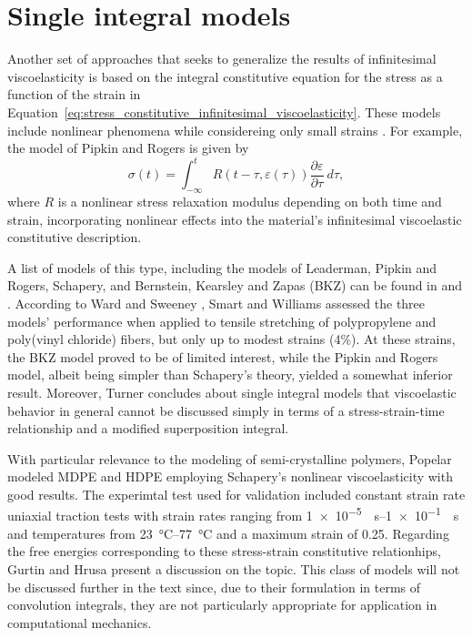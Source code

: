 \section{Single integral models}
Another set of approaches that seeks to generalize the results of infinitesimal viscoelasticity is based on the integral constitutive equation for the stress as a function of the strain in Equation~\eqref{eq:stress_constitutive_infinitesimal_viscoelasticity}.
These models include nonlinear phenomena while considereing only small strains \citep{wardIntroductionMechanicalProperties2004}.
For example, the model of Pipkin and Rogers is given by \citep{wardIntroductionMechanicalProperties2004}
\begin{equation}
	\sigma(t) = \int_{-\infty}^t R(t-\tau, \varepsilon(\tau))\frac{\partial \varepsilon}{\partial \tau}\ d\tau,
\end{equation}
where $R$ is a nonlinear stress relaxation modulus depending on both time and strain, incorporating nonlinear effects into the material's infinitesimal viscoelastic constitutive description.

A list of models of this type, including the models of Leaderman, Pipkin and Rogers, Schapery, and Bernstein, Kearsley and Zapas (BKZ) can be found in \cite{wardIntroductionMechanicalProperties2004} and \cite{malkinRheologyConceptsMethods2017}.
According to Ward and Sweeney \citep{wardIntroductionMechanicalProperties2004}, Smart and Williams \citep{smartComparisonSingleintegralNonlinear1972} assessed the three models' performance when applied to tensile stretching of polypropylene and poly(vinyl chloride) fibers, but only up to modest strains (4\%).
At these strains, the BKZ model proved to be of limited interest, while the Pipkin and Rogers model, albeit being simpler than Schapery's theory, yielded a somewhat inferior result.
Moreover, Turner \citep{turnerStrainResponsePlastics1966} concludes about single integral models that viscoelastic behavior in general cannot be discussed simply in terms of a stress-strain-time relationship and a modified superposition integral.

With particular relevance to the modeling of semi-crystalline polymers, Popelar \citep{popelarViscoelasticMaterialCharacterization1990} modeled MDPE and HDPE employing Schapery's nonlinear viscoelasticity with good results.
The experimtal test used for validation included constant strain rate uniaxial traction tests with strain rates ranging from \SIrange{1e-5}{1e-1}{\per\second} and temperatures from \SIrange{23}{77}{\celsius} and a maximum strain of 0.25.
Regarding the free energies corresponding to these stress-strain constitutive relationhips, Gurtin and Hrusa \citep{gurtinEnergiesNonlinearViscoelastic1988} present a discussion on the topic.
This class of models will not be discussed further in the text since, due to their formulation in terms of convolution integrals, they are not particularly appropriate for application in computational mechanics.

